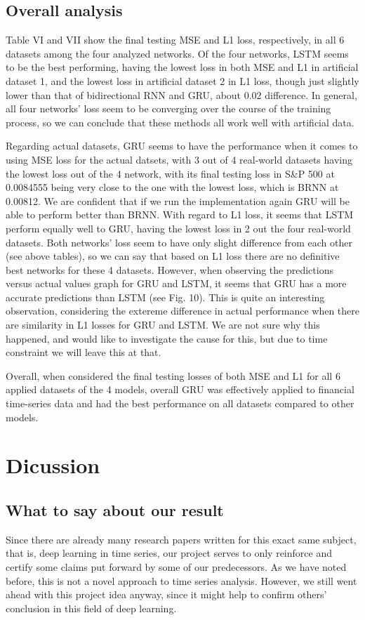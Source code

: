 \documentclass[letterpaper, 10 pt, conference]{ieeeconf}  %
\begin{document}
    \subsection{Overall analysis}
        Table VI and VII show the final testing MSE and L1 loss, respectively, in all 6 datasets among the four analyzed networks. Of the four networks, LSTM seems to be the best performing, having the lowest loss in both MSE and L1 in artificial dataset 1, and the lowest loss in artificial dataset 2 in L1 loss, though just slightly lower than that of bidirectional RNN and GRU, about 0.02 difference. In general, all four networks' loss seem to be converging over the course of the training process, so we can conclude that these methods all work well with artificial data.

        Regarding actual datasets, GRU seems to have the performance when it comes to using MSE loss for the actual datsets, with 3 out of 4 real-world datasets having the lowest loss out of the 4 network, with its final testing loss in S\&P 500 at 0.0084555 being very close to the one with the lowest loss, which is BRNN at 0.00812. We are confident that if we run the implementation again GRU will be able to perform better than BRNN. With regard to L1 loss, it seems that LSTM perform equally well to GRU, having the lowest loss in 2 out the four real-world datasets. Both networks' loss seem to have only slight difference from each other (see above tables), so we can say that based on L1 loss there are no definitive best networks for these 4 datasets. However, when observing the predictions versus actual values graph for GRU and LSTM, it seems that GRU has a more accurate predictions than LSTM (see Fig. 10). This is quite an interesting observation, considering the extereme difference in actual performance when there are similarity in L1 losses for GRU and LSTM. We are not sure why this happened, and would like to investigate the cause for this, but due to time constraint we will leave this at that.
        
        Overall, when considered the final testing losses of both MSE and L1 for all 6 applied datasets of the 4 models, overall GRU was effectively applied to financial time-series data and had the best performance on all datasets compared to other models.

\section{Dicussion}
    \subsection{What to say about our result}
        Since there are already many research papers written for this exact same subject, that is, deep learning in time series, our project serves to only reinforce and certify some claims put forward by some of our predecessors. As we have noted before, this is not a novel approach to time series analysis. However, we still went ahead with this project idea anyway, since it might help to confirm others' conclusion in this field of deep learning.
\end{document}
